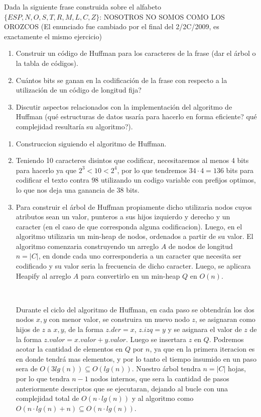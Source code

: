 \documentclass[10pt, a4paper]{report}
\begin{document}
Dada la siguiente frase construida sobre el alfabeto $\{ESP,N,O,S,T,R,M,L,C,Z\}$: NOSOTROS NO SOMOS COMO LOS OROZCOS
(El enunciado fue cambiado por el final del 2/2C/2009, es exactamente el mismo ejercicio)

\begin{enumerate}
 \item Construir un c\'odigo de Huffman para los caracteres de la frase (dar el \'arbol o la tabla de c\'odigos).
 \item Cu\'antos bits se ganan en la codificaci\'on de la frase con respecto a la utilizaci\'on de un c\'odigo de longitud fija?
 \item Discutir aspectos relacionados con la implementaci\'on del algoritmo de Huffman (qu\'e estructuras de datos usar\'ia para hacerlo en forma eficiente? qu\'e complejidad resultar\'ia su algoritmo?).
\end{enumerate}

\begin{enumerate}
 \item Construccion siguiendo el algoritmo de Huffman.
 \item Teniendo 10 caracteres disintos que codificar, necesitaremos al menos 4 bits para hacerlo ya que $2^3 < 10 < 2^4$, por lo que tendremos $34 \cdot 4 = 136$ bits para codificar el texto contra $98$ utilizando un codigo variable con prefijos optimos, lo que nos deja una ganancia de $38$ bits.
 \item Para construir el \'arbol de Huffman propiamente dicho utilizaria nodos cuyos atributos sean un valor, punteros a sus hijos izquierdo y derecho y un caracter (en el caso de que corresponda alguna codificacion). Luego, en el algoritmo utilizaria un min-heap de nodos, ordenados a partir de su valor. El algoritmo comenzaria construyendo un arreglo $A$ de nodos de longitud $n = |C|$, en donde cada uno corresponderia a un caracter que necesita ser codificado y su valor seria la frecuencia de dicho caracter. Luego, se aplicara Heapify al arreglo $A$ para convertirlo en un min-heap $Q$ en $O(n)$.
 
 ~
 
 Durante el ciclo del algoritmo de Huffman, en cada paso se obtendr\'an los dos nodos $x,y$ con menor valor, se construira un nuevo nodo $z$, se asignaran como hijos de $z$ a $x,y$, de la forma $z.der = x$, $z.izq = y$ y se asignara el valor de $z$ de la forma $z.valor = x.valor + y.valor$. Luego se insertara $z$ en $Q$. Podremos acotar la cantidad de elementos en $Q$ por $n$, ya que en la primera iteracion es en donde tendr\'a mas elementos, y por lo tanto el tiempo insumido en un paso sera de $O(3lg(n)) \subseteq O(lg(n))$. Nuestro \'arbol tendra $n = |C|$ hojas, por lo que tendra $n-1$ nodos internos, que sera la cantidad de pasos anteriormente descriptos que se ejecutaran, dejando al bucle con una complejidad total de $O(n \cdot lg(n))$ y al algoritmo como $O(n \cdot lg(n) + n) \subseteq O(n \cdot lg(n))$.
\end{enumerate}
\end{document}
